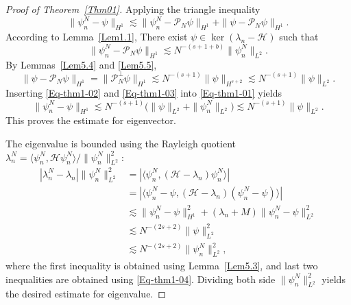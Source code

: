 \documentclass{sn-jnl}%
\numberwithin{equation}{section}
\theoremstyle{thmstyleone}%
\theoremstyle{thmstyletwo}%
\newtheorem{remark}{Remark}%
\theoremstyle{thmstylethree}%
\begin{document}

\begin{proof}[Proof of Theorem~\ref{Thm01}]
    Applying the triangle inequality
    \begin{equation}\label{Eq-thm1-01}
        \|\psi_n^N-\psi\|_{H^1} \lesssim \|\psi^N_n-\mathcal{P}_N\psi\|_{H^1} + \|\psi - \mathcal{P}_N \psi\|_{H^1}.
    \end{equation}
    According to Lemma~\ref{Lem1.1}, There exist $\psi \in \operatorname{ker}(\lambda_n-\mathcal{H})$ such that 
    \begin{equation}\label{Eq-thm1-02}
         \|\psi^N_n-\mathcal{P}_N\psi\|_{H^1}\lesssim N^{-(s+1+b)} \|\psi_n^N\|_{L^2}.
    \end{equation}
    By Lemmas~\ref{Lem5.4} and \ref{Lem5.5},
    \begin{equation}\label{Eq-thm1-03}
        \|\psi-\mathcal{P}_N\psi\|_{H^1} = \|\mathcal{P}_N^\perp\psi\|_{H^1} \lesssim N^{-(s+1)}\|\psi\|_{H^{s+2}}\lesssim N^{-(s+1)}\|\psi\|_{L^2}.
    \end{equation}    
    Inserting \eqref{Eq-thm1-02} and \eqref{Eq-thm1-03} into \eqref{Eq-thm1-01} yields
    \begin{equation}\label{Eq-thm1-04}
        \|\psi_n^N-\psi\|_{H^1} \lesssim N^{-(s+1)}\bigl(\|\psi\|_{L^2}+\|\psi_n^N\|_{L^2}\bigr)\lesssim N^{-(s+1)}\|\psi\|_{L^2}.
    \end{equation}
    This proves the estimate for eigenvector. 
    
    The eigenvalue is bounded using the Rayleigh quotient $\lambda_n^N = \langle \psi_n^N,\mathcal{H}\psi_n^N\rangle/\|\psi_n^N\|_{L^2}^2$:
    \begin{equation}
    \begin{aligned}
        |\lambda_n^N-\lambda_n| \|\psi_n^N\|^2_{L^2}
        &= 
        \left|\langle \psi_n^N,(\mathcal{H}-\lambda_n)\psi_n^N\rangle\right|\\
        &=
        \left| \langle \psi_n^N-\psi,(\mathcal{H}-\lambda_n)(\psi_n^N-\psi)\rangle  \right|\\
        &\lesssim 
        \|\psi_n^N-\psi\|_{H^1}^2 + (\lambda_n+M)\|\psi_n^N-\psi\|_{L^2}^2\\
        &\lesssim N^{-(2s+2)}\|\psi\|_{L^2}^2\\
        &\lesssim N^{-(2s+2)}\|\psi_n^N\|_{L^2}^2,
    \end{aligned}
    \end{equation}
    where the first inequality is obtained using Lemma~\ref{Lem5.3}, and last two inequalities are obtained using \eqref{Eq-thm1-04}. Dividing both side $\|\psi_n^N\|_{L^2}^2$ yields the desired estimate for eigenvalue.
\end{proof}
\end{document}

